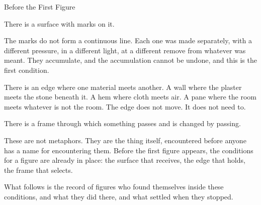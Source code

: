 
\begin{interlude}{Before the First Figure}

There is a surface with marks on it.

The marks do not form a continuous line. Each one was made separately,
with a different pressure, in a different light, at a different remove
from whatever was meant. They accumulate, and the accumulation cannot be
undone, and this is the first condition.

There is an edge where one material meets another. A wall where the
plaster meets the stone beneath it. A hem where cloth meets air. A pane
where the room meets whatever is not the room. The edge does not move.
It does not need to.

There is a frame through which something passes and is changed by
passing.

These are not metaphors. They are the thing itself, encountered before
anyone has a name for encountering them. Before the first figure appears,
the conditions for a figure are already in place: the surface that
receives, the edge that holds, the frame that selects.

What follows is the record of figures who found themselves inside these
conditions, and what they did there, and what settled when they stopped.

\end{interlude}
